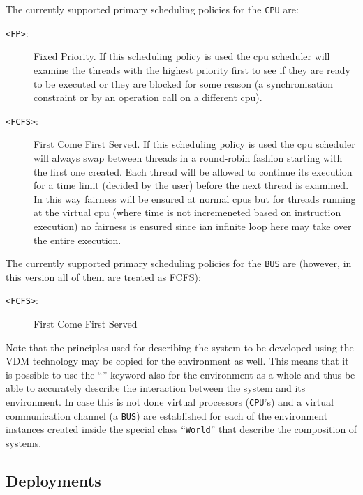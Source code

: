 \documentclass{overturerepchap}
\newcommand{\keyw}[1]{{\bf\ttfamily{#1}}}
\begin{document}
The currently supported primary scheduling policies for the \texttt{CPU}
are:
\begin{description}
\item[\texttt{<FP>}:] Fixed Priority. If this scheduling policy is
  used the cpu scheduler will examine the threads with the highest
  priority first to see if they are ready to be executed or they are
  blocked for some reason (a synchronisation constraint or by an
  operation call on a different cpu).
\item[\texttt{<FCFS>}:] First Come First Served. If this scheduling
  policy is used the cpu scheduler will always swap between threads in
  a round-robin fashion starting with the first one created. Each
  thread will be allowed to continue its execution for a time limit
  (decided by the user) before the next thread is examined. In this
  way fairness will be ensured at normal cpus but for threads running
  at the virtual cpu (where time is not incremeneted based on
  instruction execution) no fairness is ensured since ian infinite
  loop here may take over the entire execution.
\end{description} 

The currently supported primary scheduling policies for the \texttt{BUS}
are (however, in this version all of them are treated as FCFS):
\begin{description}
\item[\texttt{<FCFS>}:] First Come First Served
\end{description} 

Note that the principles used for describing the system to be developed using 
the VDM technology may be copied for the environment as well. This means that
it is possible to use the ``\keyw{system}'' keyword also for the environment as
a whole and thus be able to accurately describe the interaction between the
system and its environment. In case this is not done virtual processors 
(\texttt{CPU}'s)
and a virtual communication channel (a \texttt{BUS}) 
are established for each of the
environment instances created inside the special class ``\texttt{World}''
that describe the composition of systems.

\subsection{Deployments}
\end{document}
